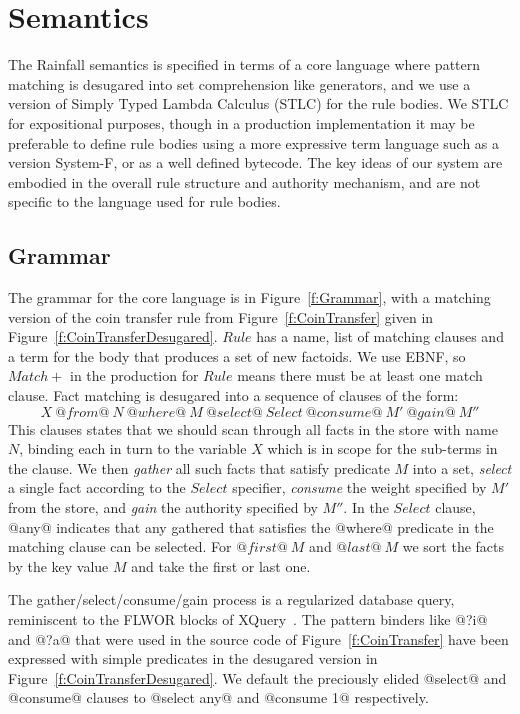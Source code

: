 
\section{Semantics}
The Rainfall semantics is specified in terms of a core language where pattern matching is desugared into set comprehension like generators, and we use a version of Simply Typed Lambda Calculus (STLC) for the rule bodies. We STLC for expositional purposes, though in a production implementation it may be preferable to define rule bodies using a more expressive term language such as a version System-F, or as a well defined bytecode. The key ideas of our system are embodied in the overall rule structure and authority mechanism, and are not specific to the language used for rule bodies.

\subsection{Grammar}
The grammar for the core language is in Figure~\ref{f:Grammar}, with a matching version of the coin transfer rule from Figure~\ref{f:CoinTransfer} given in Figure~\ref{f:CoinTransferDesugared}.
$Rule$ has a name, list of matching clauses and a term for the body that produces a set of new factoids. We use EBNF, so $Match+$ in the production for $Rule$ means there must be at least one match clause. Fact matching is desugared into a sequence of clauses of the form:
$$
X~ @from@~ N~ @where@~ M~ @select@~ Select~ @consume@~ M'~ @gain@~ M''
$$
This clauses states that we should scan through all facts in the store with name $N$, binding each in turn to the variable $X$ which is in scope for the sub-terms in the clause. We then \emph{gather} all such facts that satisfy predicate $M$ into a set, \emph{select} a single fact according to the $Select$ specifier, \emph{consume} the weight specified by $M'$ from the store, and \emph{gain} the authority specified by $M''$. In the $Select$ clause, @any@ indicates that any gathered that satisfies the @where@ predicate in the matching clause can be selected. For $@first@~ M$ and $@last@~ M$ we sort the facts by the key value $M$ and take the first or last one.

The gather/select/consume/gain process is a regularized database query, reminiscent to the FLWOR blocks of XQuery~\cite{Boag2002:XQuery}. The pattern binders like @?i@ and @?a@ that were used in the source code of Figure~\ref{f:CoinTransfer} have been expressed with simple predicates in the desugared version in Figure~\ref{f:CoinTransferDesugared}. We default the preciously elided @select@ and @consume@ clauses to @select any@ and @consume 1@ respectively.

